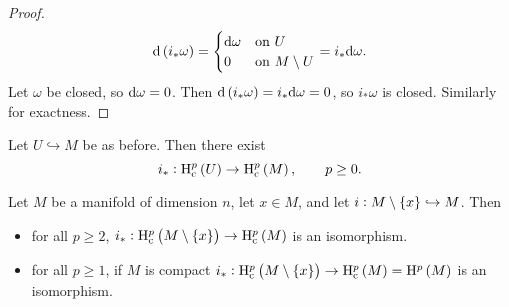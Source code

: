 \begin{proof}
$$ \d\br{i_*\omega} =
\begin{cases}
\d\omega & \text{on} \ U \\
0 & \text{on} \ M \setminus U
\end{cases}
= i_*\d\omega. $$
Let $ \omega $ be closed, so $ \mathrm{d}\omega = 0 $. Then $ \d\br{i_*\omega} = i_*\d\omega = 0 $, so $ i_*\omega $ is closed. Similarly for exactness.
\end{proof}

Let $ U \hookrightarrow M $ be as before. Then there exist
$$ i_* : \H_\c^p\br{U} \to \H_\c^p\br{M}, \qquad p \ge 0. $$

\begin{proposition}
\label{prop:2.43}
Let $ M $ be a manifold of dimension $ n $, let $ x \in M $, and let $ i : M \setminus \cbr{x} \hookrightarrow M $. Then
\begin{itemize}
\item for all $ p \ge 2 $, $ i_* : \H_\c^p\br{M \setminus \cbr{x}} \to \H_\c^p\br{M} $ is an isomorphism.
\item for all $ p \ge 1 $, if $ M $ is compact $ i_* : \H_\c^p\br{M \setminus \cbr{x}} \to \H_\c^p\br{M} = \H^p\br{M} $ is an isomorphism.
\end{itemize}
\end{proposition}

